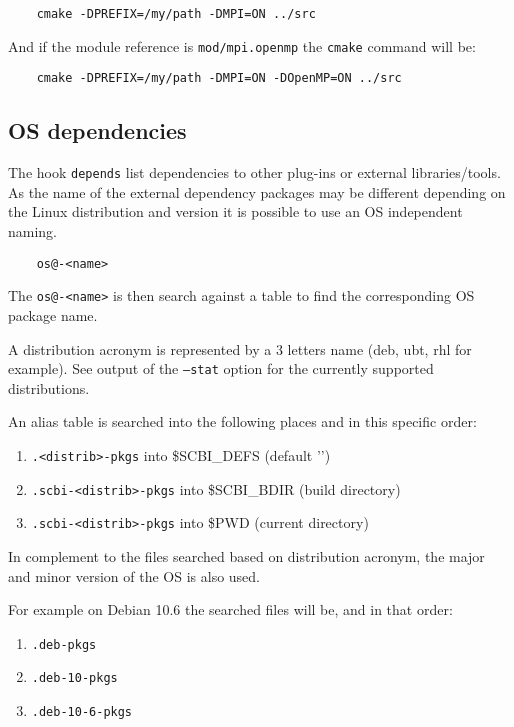 \documentclass[a4paper,12pt,twoside]{article}
\newcommand{\code}[1]{\texttt{#1}}
\newcommand{\file}[1]{'{\path{#1}}'}
\begin{document}
\begin{lstlisting}
	cmake -DPREFIX=/my/path -DMPI=ON ../src
\end{lstlisting}

And if the module reference is \code{mod/mpi.openmp} the \code{cmake} command will be:

\begin{lstlisting}
	cmake -DPREFIX=/my/path -DMPI=ON -DOpenMP=ON ../src
\end{lstlisting}

\subsection{OS dependencies}
\label{OS dependencies}

The hook \code{depends} list dependencies to other plug-ins or external libraries/tools. As the name of the external dependency packages may be different depending on the Linux distribution and version it is possible to use an OS independent naming.

\begin{lstlisting}
	os@-<name>
\end{lstlisting}

The \code{os@-<name>} is then search against a table to find the corresponding OS package name.

A distribution acronym is represented by a 3 letters name (deb, ubt, rhl for example). See output of the \code{--stat} option for the currently supported distributions.

An alias table is searched into the following places and in this specific order:

\begin{enumerate}
	\item \code{.<distrib>-pkgs} into \$SCBI\_DEFS (default \file{~/.config/scbi})
	\item \code{.scbi-<distrib>-pkgs} into \$SCBI\_BDIR (build directory)
	\item \code{.scbi-<distrib>-pkgs} into \$PWD (current directory)
\end{enumerate}

In complement to the files searched based on distribution acronym, the major and minor version of the OS is also used.

For example on Debian 10.6 the searched files will be, and in that order:

\begin{enumerate}
	\item \code{.deb-pkgs}
	\item \code{.deb-10-pkgs}
	\item \code{.deb-10-6-pkgs}
\end{enumerate}
\end{document}
